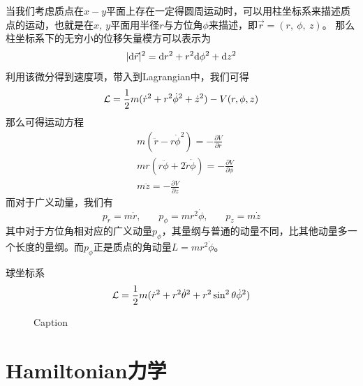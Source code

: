 当我们考虑质点在$x-y$平面上存在一定得圆周运动时，可以用柱坐标系来描述质点的运动，也就是在$x,~y$平面用半径$r$与方位角$\phi$来描述，即$\vec{r} = (r,~\phi,~z)$。
那么柱坐标系下的无穷小的位移矢量模方可以表示为
\begin{equation}
    |\mathrm{d}\vec{r}|^2 = \mathrm{d} r ^2 + r^2 \mathrm{d} \phi^2 + \mathrm{d} z ^2
\end{equation}
利用该微分得到速度项，带入到Lagrangian中，我们可得
\begin{equation}
    \mathcal{L} = \frac{1}{2} m  (\dot r^2 +r^2\dot \phi^2 + \dot z^2) - V(r,\phi,z)
\end{equation}
那么可得运动方程
\begin{align}
        &m(\ddot r - r\dot\phi^2) = -\frac{\partial V}{\partial r}\\
        &mr(r\ddot \phi + 2\dot r \dot\phi)  = -\frac{\partial V}{\partial \phi}\\
        &m\ddot z = -\frac{\partial V}{\partial z}
\end{align}
而对于广义动量，我们有
\begin{equation}
    p_r  = m\dot r,~~~~~~~~
    p_\phi = mr^2\dot\phi ,~~~~~~~~
    p_z = m\dot z
\end{equation}
其中对于方位角相对应的广义动量$p_\phi$，其量纲与普通的动量不同，比其他动量多一个长度的量纲。而$p_\phi$正是质点的角动量$L=mr^2\dot\phi$。


球坐标系
\begin{equation}
    \mathcal{L} = \frac{1}{2} m  (\dot r^2 +r^2\dot \theta^2 + r^2\sin^2\theta \dot \phi^2)
\end{equation}

\begin{figure}[h]
    \centering
 
    \caption{Caption}
    \label{fig:naturacoord}
\end{figure}

\chapter{Hamiltonian力学}

